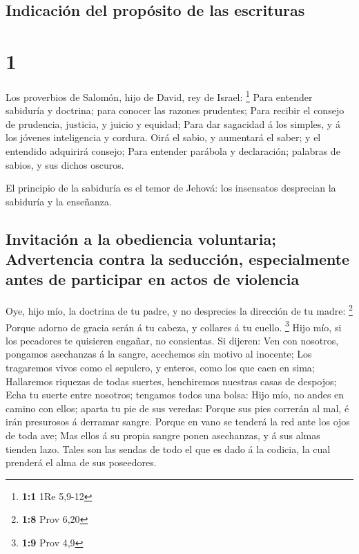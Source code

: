 \hypertarget{indicaciuxf3n-del-propuxf3sito-de-las-escrituras}{%
\subsection{Indicación del propósito de las
escrituras}\label{indicaciuxf3n-del-propuxf3sito-de-las-escrituras}}

\hypertarget{section}{%
\section{1}\label{section}}

 Los proverbios de Salomón, hijo de David, rey de Israel:
\footnote{\textbf{1:1} 1Re 5,9-12}  Para entender sabiduría
y doctrina; para conocer las razones prudentes;  Para
recibir el consejo de prudencia, justicia, y juicio y equidad;
 Para dar sagacidad á los simples, y á los jóvenes
inteligencia y cordura.  Oirá el sabio, y aumentará el
saber; y el entendido adquirirá consejo;  Para entender
parábola y declaración; palabras de sabios, y sus dichos oscuros.

 El principio de la sabiduría es el temor de Jehová: los
insensatos desprecian la sabiduría y la enseñanza.

\hypertarget{invitaciuxf3n-a-la-obediencia-voluntaria-advertencia-contra-la-seducciuxf3n-especialmente-antes-de-participar-en-actos-de-violencia}{%
\subsection{Invitación a la obediencia voluntaria; Advertencia contra la
seducción, especialmente antes de participar en actos de
violencia}\label{invitaciuxf3n-a-la-obediencia-voluntaria-advertencia-contra-la-seducciuxf3n-especialmente-antes-de-participar-en-actos-de-violencia}}

 Oye, hijo mío, la doctrina de tu padre, y no desprecies la
dirección de tu madre: \footnote{\textbf{1:8} Prov 6,20} 
Porque adorno de gracia serán á tu cabeza, y collares á tu cuello.
\footnote{\textbf{1:9} Prov 4,9}  Hijo mío, si los
pecadores te quisieren engañar, no consientas.  Si dijeren:
Ven con nosotros, pongamos asechanzas á la sangre, acechemos sin motivo
al inocente;  Los tragaremos vivos como el sepulcro, y
enteros, como los que caen en sima;  Hallaremos riquezas de
todas suertes, henchiremos nuestras casas de despojos; 
Echa tu suerte entre nosotros; tengamos todos una bolsa: 
Hijo mío, no andes en camino con ellos; aparta tu pie de sus veredas:
 Porque sus pies correrán al mal, é irán presurosos á
derramar sangre.  Porque en vano se tenderá la red ante los
ojos de toda ave;  Mas ellos á su propia sangre ponen
asechanzas, y á sus almas tienden lazo.  Tales son las
sendas de todo el que es dado á la codicia, la cual prenderá el alma de
sus poseedores.


